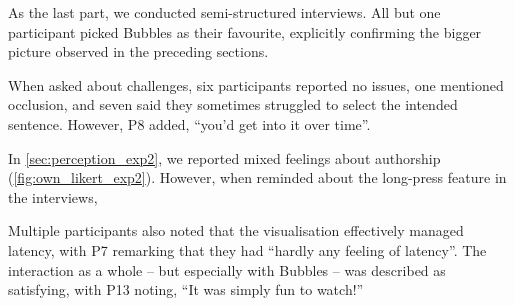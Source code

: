 As the last part, we conducted semi-structured interviews. %
All but one participant %
picked Bubbles as their favourite, explicitly confirming the bigger picture observed in the preceding sections.




When asked about challenges, six participants reported no issues, one mentioned occlusion, and seven said they sometimes struggled to select the intended sentence. 
However, P8 added, ``you'd get into it over time''.

In \cref{sec:perception_exp2}, we reported mixed feelings about authorship (\cref{fig:own_likert_exp2}). 
However, when reminded about the long-press feature in the interviews, 

Multiple participants also noted that the visualisation effectively managed latency, with P7 remarking that they had ``hardly any feeling of latency''. %
The interaction as a whole -- but especially with Bubbles -- was described as satisfying, with P13 noting, ``It was simply fun to watch!''







